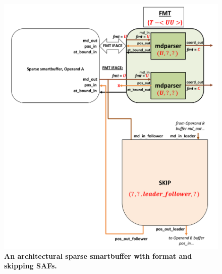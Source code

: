 \begin{figure}[H]
\includegraphics[width=\textwidth]{figures/safinference_build_05mdparserfmtattr.png}
\caption{\textbf{An architectural sparse smartbuffer with format and skipping SAFs.}}
\label{fig:safinference_build_05mdparserfmtattr}
\centering
\end{figure}



